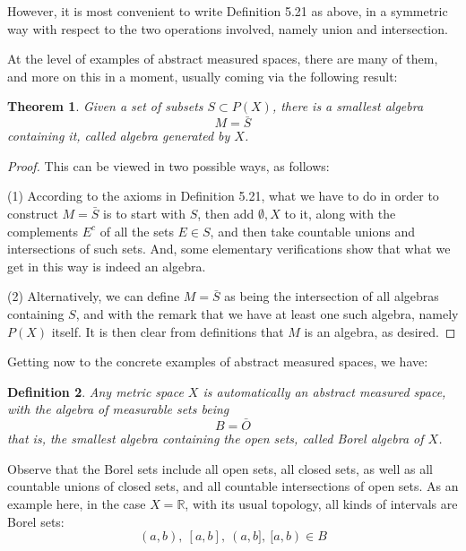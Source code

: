 \documentclass[12pt]{amsbook}
\newtheorem{theorem}{Theorem}[chapter]
\newtheorem{definition}[theorem]{Definition}
\begin{document}
However, it is most convenient to write Definition 5.21 as above, in a symmetric way with respect to the two operations involved, namely union and intersection.

\bigskip

At the level of examples of abstract measured spaces, there are many of them, and more on this in a moment, usually coming via the following result:

\begin{theorem}
Given a set of subsets $S\subset P(X)$, there is a smallest algebra
$$M=\bar{S}$$
containing it, called algebra generated by $X$.
\end{theorem}

\begin{proof}
This can be viewed in two possible ways, as follows:

\medskip

(1) According to the axioms in Definition 5.21, what we have to do in order to construct $M=\bar{S}$ is to start with $S$, then add $\emptyset,X$ to it, along with the complements $E^c$ of all the sets $E\in S$, and then take countable unions and intersections of such sets. And, some elementary verifications show that what we get in this way is indeed an algebra.

\medskip

(2) Alternatively, we can define $M=\bar{S}$ as being the intersection of all algebras containing $S$, and with the remark that we have at least one such algebra, namely $P(X)$ itself. It is then clear from definitions that $M$ is an algebra, as desired.
\end{proof}

Getting now to the concrete examples of abstract measured spaces, we have:


\begin{definition}
Any metric space $X$ is automatically an abstract measured space, with the algebra of measurable sets being 
$$B=\bar{O}$$
that is, the smallest algebra containing the open sets, called Borel algebra of $X$.
\end{definition}

Observe that the Borel sets include all open sets, all closed sets, as well as all countable unions of closed sets, and all countable intersections of open sets. As an example here, in the case $X=\mathbb R$, with its usual topology, all kinds of intervals are Borel sets:
$$(a,b),\ [a,b],\ (a,b],\ [a,b)\in B$$
\end{document}
